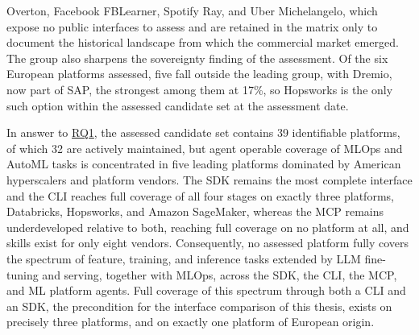 \documentclass[
english,                 %
bibtex,                  %
]{kththesis}
\numberwithin{listing}{chapter}
\begin{document}
Overton, Facebook \gls{FB}Learner, Spotify Ray, and Uber Michelangelo, which expose no public interfaces to assess and are retained in the matrix only to document the historical landscape from which the commercial market emerged. The group also sharpens the sovereignty finding of the assessment. Of the six European platforms assessed, five fall outside the leading group, with Dremio, now part of \gls{SAP}, the strongest among them at 17\%, so Hopsworks is the only such option within the assessed candidate set at the assessment date.

In answer to \hyperref[rq1]{RQ1}, the assessed candidate set contains 39 identifiable platforms, of which 32 are actively maintained, but agent operable coverage of \gls{MLOps} and \gls{AutoML} tasks is concentrated in five leading platforms dominated by American hyperscalers and platform vendors. The \gls{SDK} remains the most complete interface and the \gls{CLI} reaches full coverage of all four stages on exactly three platforms, Databricks, Hopsworks, and Amazon SageMaker, whereas the \gls{MCP} remains underdeveloped relative to both, reaching full coverage on no platform at all, and skills exist for only eight vendors. Consequently, no assessed platform fully covers the spectrum of feature, training, and inference tasks extended by \gls{LLM} fine-tuning and serving, together with \gls{MLOps}, across the \gls{SDK}, the \gls{CLI}, the \gls{MCP}, and \gls{ML} platform agents. Full coverage of this spectrum through both a \gls{CLI} and an \gls{SDK}, the precondition for the interface comparison of this thesis, exists on precisely three platforms, and on exactly one platform of European origin.
\end{document}
